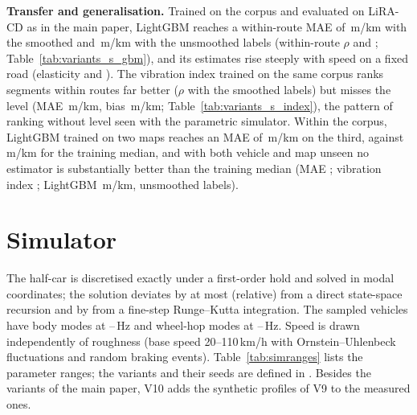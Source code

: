 \documentclass[onecolumn,10pt]{IEEEtran}
\begin{document}
\textbf{Transfer and generalisation.}
Trained on the corpus and evaluated on LiRA-CD as in the main paper, LightGBM reaches a within-route MAE of \vvBcorrMaeWithin\,m/km with the smoothed and \vvBrawMaeWithin\,m/km with the unsmoothed labels (within-route $\rho$ \vvBcorrRhoWithin{} and \vvBrawRhoWithin; Table~\ref{tab:variants_s_gbm}), and its estimates rise steeply with speed on a fixed road (elasticity \vvBcorrElastPooled{} and \vvBrawElastPooled).
The vibration index trained on the same corpus ranks segments within routes far better ($\rho$ \vvBcorrIdxRhoWithin{} with the smoothed labels) but misses the level (MAE \vvBcorrIdxMae\,m/km, bias \vvBcorrIdxBias\,m/km; Table~\ref{tab:variants_s_index}), the pattern of ranking without level seen with the parametric simulator.
Within the corpus, LightGBM trained on two maps reaches an MAE of \bngSoneCorrGbmMae\,m/km on the third, against \bngSoneCorrConstMae\,m/km for the training median, and with both vehicle and map unseen no estimator is substantially better than the training median (MAE \bngStwoConstMae; vibration index \bngStwoPhysMae; LightGBM \bngStwoGbmMae\,m/km, unsmoothed labels).

\section{Simulator}
\label{sec:s_sim}
The half-car is discretised exactly under a first-order hold and solved in modal coordinates; the solution deviates by at most \simModalDev{} (relative) from a direct state-space recursion and by \simRkDev{} from a fine-step Runge--Kutta integration.
The sampled vehicles have body modes at \simBodyHzLo--\simBodyHzHi\,Hz and wheel-hop modes at \simHopHzLo--\simHopHzHi\,Hz.
Speed is drawn independently of roughness (base speed 20--110\,km/h with Ornstein--Uhlenbeck fluctuations and random braking events).
Table~\ref{tab:simranges} lists the parameter ranges; the variants and their seeds are defined in .
Besides the variants of the main paper, V10 adds the synthetic profiles of V9 to the measured ones.


\end{document}
